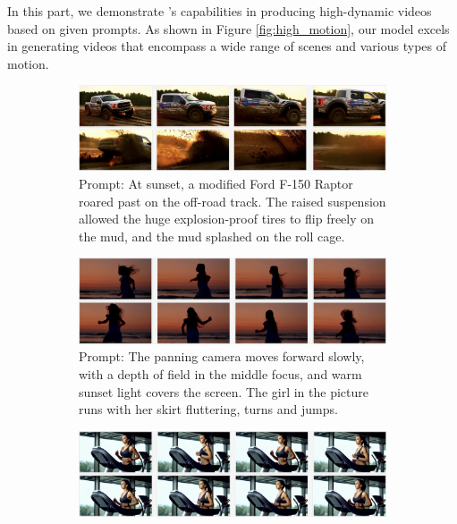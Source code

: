 In this part, we demonstrate \nameofmethod{}'s capabilities in producing high-dynamic videos based on given prompts. As shown in Figure \ref{fig:high_motion}, our model excels in generating videos that encompass a wide range of scenes and various types of motion.

\begin{figure}[!htbp]
    \centering
    \begin{subfigure}{\textwidth}
        \centering
        \includegraphics[width=\textwidth]{figures/high_motion_3.jpg}
        \captionsetup{font=small}
        \caption{Prompt: At sunset, a modified Ford F-150 Raptor roared past on the off-road track. The raised suspension allowed the huge explosion-proof tires to flip freely on the mud, and the mud splashed on the roll cage.}
        \label{fig:hm_1}
    \end{subfigure}
    \hfill
    \begin{subfigure}{\textwidth}
        \centering
        \includegraphics[width=\textwidth]{figures/high_motion_5.jpg}
        \captionsetup{font=small}
        \caption{Prompt: The panning camera moves forward slowly, with a depth of field in the middle focus, and warm sunset light covers the screen. The girl in the picture runs with her skirt fluttering, turns and jumps.}
        \label{fig:hm_2}
    \end{subfigure}
    \hfill
    \begin{subfigure}{\textwidth}
        \centering
        \includegraphics[width=\textwidth]{figures/high_motion_2.jpg}

\end{subfigure}
\end{figure}
